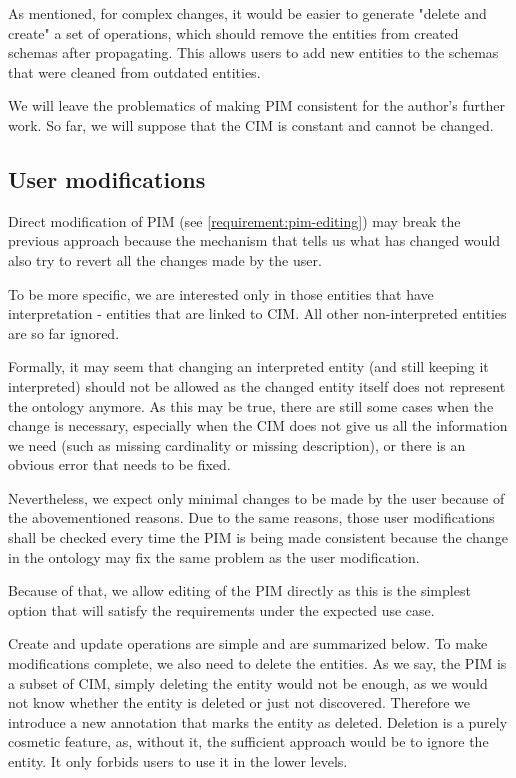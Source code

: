 As mentioned, for complex changes, it would be easier to generate "delete and create" a set of operations, which should remove the entities from created schemas after propagating. This allows users to add new entities to the schemas that were cleaned from outdated entities.

\medskip

We will leave the problematics of making PIM consistent for the author's further work. So far, we will suppose that the CIM is constant and cannot be changed.

\subsection{User modifications}

Direct modification of PIM (see \autoref{requirement:pim-editing}) may break the previous approach because the mechanism that tells us what has changed would also try to revert all the changes made by the user.

To be more specific, we are interested only in those entities that have interpretation - entities that are linked to CIM. All other non-interpreted entities are so far ignored.

Formally, it may seem that changing an interpreted entity (and still keeping it interpreted) should not be allowed as the changed entity itself does not represent the ontology anymore. As this may be true, there are still some cases when the change is necessary, especially when the CIM does not give us all the information we need (such as missing cardinality or missing description), or there is an obvious error that needs to be fixed.

\medskip

Nevertheless, we expect only minimal changes to be made by the user because of the abovementioned reasons. Due to the same reasons, those user modifications shall be checked every time the PIM is being made consistent because the change in the ontology may fix the same problem as the user modification.

Because of that, we allow editing of the PIM directly as this is the simplest option that will satisfy the requirements under the expected use case.

Create and update operations are simple and are summarized below. To make modifications complete, we also need to delete the entities. As we say, the PIM is a subset of CIM, simply deleting the entity would not be enough, as we would not know whether the entity is deleted or just not discovered. Therefore we introduce a new annotation that marks the entity as deleted. Deletion is a purely cosmetic feature, as, without it, the sufficient approach would be to ignore the entity. It only forbids users to use it in the lower levels.

